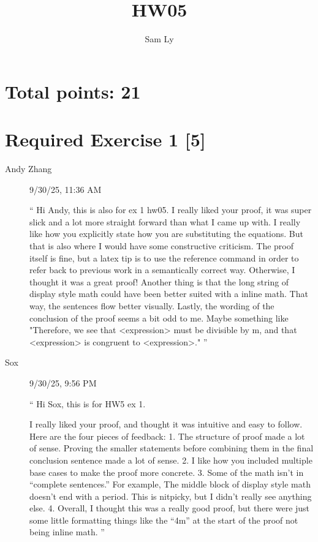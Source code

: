 \documentclass{article}
\title{HW05}
\author{Sam Ly}
\begin{document}
\maketitle

\section*{Total points: 21}

\section*{Required Exercise 1 [5]}
\begin{description}
    \item[Andy Zhang] {
        9/30/25, 11:36 AM

        ``
       Hi Andy, this is also for ex 1 hw05. I really liked your proof, it 
       was super slick and a lot more straight forward than what I came up with. 
       I really like how you explicitly state how you are substituting the equations.
        But that is also where I would have some constructive criticism. The proof 
        itself is fine, but a latex tip is to use the reference command in order to refer back to previous work in a semantically correct way. Otherwise, I thought it was a great proof! Another thing is that the long string of display style math could have been better suited with a inline math. That way, the sentences flow better visually. Lastly, the wording of the conclusion of the proof seems a bit odd to me. Maybe something like "Therefore, we see that <expression> must be divisible by m, and that <expression> is congruent to <expression>." 
        ''
    }

    \item[Sox] {
        9/30/25, 9:56 PM

        ``
        Hi Sox, this is for HW5 ex 1.

I really liked your proof, and thought it was intuitive and easy to follow. Here are the four pieces of feedback:
1. The structure of proof made a lot of sense. Proving the smaller statements before combining them in the final conclusion sentence made a lot of sense.
2. I like how you included multiple base cases to make the proof more concrete.
3. Some of the math isn’t in “complete sentences.” For example, The middle block of display style math doesn’t end with a period. This is nitpicky, but I didn’t really see anything else.
4. Overall, I thought this was a really good proof, but there were just some little formatting things like the “4m” at the start of the proof not being inline math.
        ''
    }
\end{description}
\end{document}
